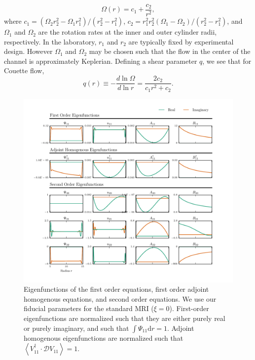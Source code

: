 \documentclass{emulateapj}
\begin{document}
\begin{equation}
  \label{eq:couette_flow}
  \Omega(r) = c_1 + \frac{c_2}{r^2},
\end{equation}
where $c_1 = (\Omega_2 r^2_2 - \Omega_1 r^2_1)/(r^2_2 - r^2_1)$, $c_2 = r^2_1 r^2_2 (\Omega_1 - \Omega_2)/(r^2_2 - r^2_1)$, and $\Omega_1$ and $\Omega_2$ are the rotation rates at the inner and outer cylinder radii, respectively. In the laboratory, $r_1$ and $r_2$ are typically fixed by experimental design. However $\Omega_1$ and $\Omega_2$ may be chosen such that the flow in the center of the channel is approximately Keplerian. Defining a shear parameter $q$, we see that for Couette flow,
\begin{equation}
  \label{eq:couette_q}
  q(r) \equiv -\frac{d \ln \Omega}{d \ln r} = \frac{2 c_2}{c_1 r^2 + c_2}.
\end{equation}

\begin{figure}
\centering
\includegraphics[width=\textwidth]{../python/widegap/figures/orders_1_2_widegap_fiducial_eigenfunctions.pdf}
\caption{Eigenfunctions of the first order equations, first order adjoint homogenous equations, and second order equations. We use our fiducial parameters for the standard MRI ($\xi = 0$). First-order eigenfunctions are normalized such that they are either purely real or purely imaginary, and such that $\int \Psi_{11} \mathrm{d}r = 1$. Adjoint homogenous eigenfunctions are normalized such that $\left< V_{11}^\dagger \cdot \mathcal{D} V_{11} \right> = 1$.}\label{fig:linear_eigenfunctions}
\end{figure}
\end{document}
